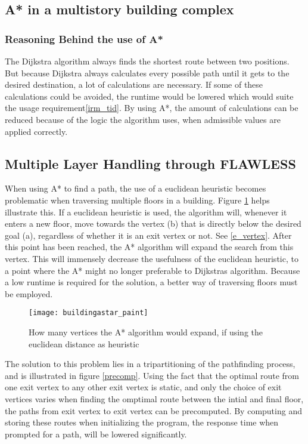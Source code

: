 \subsection{A* in a multistory building complex}

\subsubsection{Reasoning Behind the use of A*}
The Dijkstra algorithm always finds the shortest route between two positions. But because Dijkstra always calculates every possible path until it gets to the desired destination, a lot of calculations are necessary. If some of these calculations could be avoided, the runtime would be lowered which would suite the usage requirement\cref{irm_tid}. By using A*, the amount of calculations can be reduced because of the logic the algorithm uses, when admissible values are applied correctly.

\subsection{Multiple Layer Handling through FLAWLESS} \label{multlayhan}

When using A* to find a path, the use of a euclidean heuristic becomes problematic when traversing multiple floors in a building. Figure \ref{fig:buildingAstar} helps illustrate this. If a euclidean heuristic is used, the algorithm will, whenever it enters a new floor, move towards the vertex (b) that is directly below the desired goal (a), regardless of whether it is an exit vertex or not. See \cref{e_vertex}. After this point has been reached, the A* algorithm will expand the search from this vertex. This will immensely decrease the usefulness of the euclidean heuristic, to a point where the A* might no longer preferable to Dijkstras algorithm. Because a low runtime is required for the solution, a better way of traversing floors must be employed.

\begin{figure}[ht!]
    \centering
    \texttt{[image: buildingastar\_paint]}
    \caption{How many vertices the A* algorithm would expand, if using the euclidean distance as heuristic}
    \label{fig:buildingAstar}
  \end{figure}

The solution to this problem lies in a tripartitioning of the pathfinding process, and is illustrated in figure \ref{precomp}. Using the fact that the optimal route from one exit vertex to any other exit vertex is static, and only the choice of exit vertices varies when finding the omptimal route between the intial and final floor, the paths from exit vertex to exit vertex can be precomputed. By computing and storing these routes when initializing the program, the response time when prompted for a path, will be lowered significantly.

